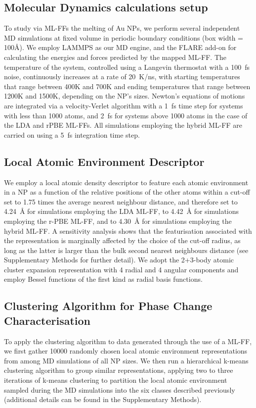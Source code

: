 \documentclass[%
aip,
 amsmath,amssymb,
 reprint,
]{revtex4-1}
\begin{document}
\subsection*{Molecular Dynamics calculations setup}
\label{subsec:md}
%
To study via ML-FFs the melting of Au NPs, we perform several independent MD simulations at fixed volume in periodic boundary conditions (box width = 100\AA). 
%
We employ LAMMPS \cite{plimpton1995fast} as our MD engine, and the FLARE \cite{vandermause2020fly} add-on for calculating the energies and forces predicted by the mapped ML-FF.
%
The temperature of the system, controlled using a Langevin thermostat with a 100~fs noise, continuously increases at a rate of 20~K/ns, with starting temperatures that range between 400K and 700K and ending temperatures that range between 1200K and 1500K, depending on the NP's sizes.
%
Newton's equations of motions are integrated via a velocity-Verlet algorithm with a 1~fs time step for systems with less than 1000 atoms, and 2~fs for systems above 1000 atoms in the case of the LDA and rPBE ML-FFs.
%
All simulations employing the hybrid ML-FF are carried on using a 5~fs integration time step.
%

%
\subsection*{Local Atomic Environment Descriptor}
\label{subsubsec:descriptor}
%
We employ a local atomic density descriptor to feature each atomic environment in a NP as a function of the relative positions of the other atoms within a cut-off set to 1.75 times the average nearest neighbour distance, and therefore set to 4.24~$\text{\AA}$ for simulations employing the LDA ML-FF, to 4.42~$\text{\AA}$ for simulations employing the r-PBE ML-FF, and to 4.30~$\text{\AA}$ for simulations employing the hybrid ML-FF.
%
A sensitivity analysis shows that the featurisation associated with the representation is marginally affected by the choice of the cut-off radius, as long as the latter is larger than the bulk second nearest neighbours distance (see Supplementary Methods for further detail). 
%
We adopt the 2+3-body atomic cluster expansion representation with 4 radial and 4 angular components and employ Bessel functions of the first kind as radial basis functions. \cite{Drautz2019,Drautz2020,Zeni2021}
%
\subsection*{Clustering Algorithm for Phase Change Characterisation}
\label{subsubsec:clustering}
%
To apply the clustering algorithm to data generated through the use of a ML-FF, we first gather 10000 randomly chosen local atomic environment representations from among MD simulations of all NP sizes.
%
We then run a hierarchical k-means clustering  \cite{Macqueen1967} algorithm to group similar representations, applying two to three iterations of k-means clustering to partition the local atomic environment sampled during the MD simulations into the six classes described previously (additional details can be found in the Supplementary Methods).
%
\end{document}
